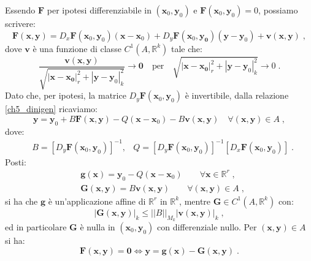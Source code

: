 \documentclass[a4paper,12pt]{report}
\theoremstyle{plain}
\theoremstyle{definition}
\theoremstyle{remark}
\numberwithin{equation}{section}
\begin{document}
\proof Essendo $\mathbf{F}$ per ipotesi differenziabile in $(\mathbf{x}_0,\mathbf{y}_0)$ e $\mathbf{F}(\mathbf{x}_0,\mathbf{y}_0)=0$, possiamo scrivere:
\begin{equation}
\mathbf{F}(\mathbf{x},\mathbf{y})=D_x\mathbf{F}(\mathbf{x}_0,\mathbf{y}_0)(\mathbf{x}-\mathbf{x}_0)+D_y\mathbf{F}(\mathbf{x}_0,\mathbf{y_0
})(\mathbf{y}-\mathbf{y}_0)+\mathbf{v}(\mathbf{x},\mathbf{y})\;, \label{ch5_dinigen}
\end{equation}
dove $\mathbf{v}$ è una funzione di classe $C^1(A,\mathbb{R}^k)$ tale che:
\begin{equation}
\frac{\mathbf{v}(\mathbf{x},\mathbf{y})}{\sqrt{|\mathbf{x}-\mathbf{x_0}|_r^2+|\mathbf{y}-\mathbf{y}_0|_k^2}} \to \mathbf{0}
\quad\mbox{per}\quad \sqrt{|\mathbf{x}-\mathbf{x_0}|_r^2+|\mathbf{y}-\mathbf{y}_0|_k^2} \to 0\;.
\end{equation}
Dato che, per ipotesi, la matrice $D_y\mathbf{F}(\mathbf{x}_0,\mathbf{y}_0)$ è invertibile, dalla relazione \eqref{ch5_dinigen} ricaviamo:
\begin{equation}
\mathbf{y}=\mathbf{y}_0+B\mathbf{F}(\mathbf{x},\mathbf{y})-Q(\mathbf{x}-\mathbf{x}_0)-B\mathbf{v}(\mathbf{x},\mathbf{y}) \quad 
\forall (\mathbf{x},\mathbf{y}) \in A\;,
\end{equation}
dove:
\begin{align}
&B=[D_y\mathbf{F}(\mathbf{x}_0,\mathbf{y}_0)]^{-1}, & Q=[D_y\mathbf{F}(\mathbf{x}_0,\mathbf{y}_0)]^{-1}[D_x\mathbf{F}(\mathbf{x}_0,\mathbf{y}_0)]\;.
\end{align}
Posti:
\begin{align}
&\mathbf{g}(\mathbf{x})=\mathbf{y}_0-Q(\mathbf{x}-\mathbf{x}_0)\qquad \forall \mathbf{x}\in\mathbb{R}^r\;, \\
&\mathbf{G}(\mathbf{x},\mathbf{y})=B\mathbf{v}(\mathbf{x},\mathbf{y})\qquad \forall (\mathbf{x},\mathbf{y})\in A\;,
\end{align}
si ha che $\mathbf{g}$ è un'applicazione affine di $\mathbb{R}^r$ in $\mathbb{R}^k$, mentre $\mathbf{G} \in C^1(A,\mathbb{R}^k)$ con:
\begin{equation}
|\mathbf{G}(\mathbf{x},\mathbf{y})|_k \le ||B||_{M_k} |\mathbf{v}(\mathbf{x},\mathbf{y})|_k\;,
\end{equation}
ed in particolare $\mathbf{G}$ è nulla in $(\mathbf{x}_0,\mathbf{y}_0)$ con differenziale nullo. Per $(\mathbf{x},\mathbf{y})\in A$ si ha:
\begin{equation}
\mathbf{F}(\mathbf{x},\mathbf{y})=\mathbf{0} \Longleftrightarrow \mathbf{y}=\mathbf{g}(\mathbf{x})-\mathbf{G}(\mathbf{x},\mathbf{y})\;.
\end{equation}
\end{document}
